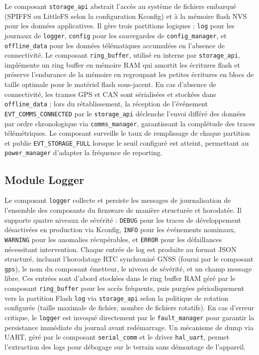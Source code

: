 Le composant \texttt{storage\_api} abstrait l'accès au système de
fichiers embarqué (SPIFFS ou LittleFS selon la configuration Kconfig)
et à la mémoire flash NVS pour les données applicatives. Il gère
trois partitions logiques : \texttt{log} pour les journaux de
\texttt{logger}, \texttt{config} pour les sauvegardes de
\texttt{config\_manager}, et \texttt{offline\_data} pour les
données télématiques accumulées en l'absence de connectivité.
Le composant \texttt{ring\_buffer}, utilisé en interne par
\texttt{storage\_api}, implémente un ring buffer en mémoire RAM qui
amortit les écritures flash et préserve l'endurance de la mémoire
en regroupant les petites écritures en blocs de taille optimale pour
le matériel flash sous-jacent. En cas d'absence de connectivité,
les trames GPS et CAN sont sérialisées et stockées dans
\texttt{offline\_data} ; lors du rétablissement, la réception de
l'événement \texttt{EVT\_COMMS\_CONNECTED} par le \texttt{storage\_api}
déclenche l'envoi différé des données par ordre chronologique via
\texttt{comms\_manager}, garantissant la complétude des traces
télémétriques. Le composant surveille le taux de remplissage de
chaque partition et publie \texttt{EVT\_STORAGE\_FULL} lorsque
le seuil configuré est atteint, permettant au \texttt{power\_manager}
d'adapter la fréquence de reporting.

\subsection{Module Logger}
\label{subsec:mod_logger}

Le composant \texttt{logger} collecte et persiste les messages de
journalisation de l'ensemble des composants du firmware de manière
structurée et horodatée. Il supporte quatre niveaux de sévérité :
\texttt{DEBUG} pour les traces de développement désactivées en
production via Kconfig, \texttt{INFO} pour les événements nominaux,
\texttt{WARNING} pour les anomalies récupérables, et \texttt{ERROR}
pour les défaillances nécessitant intervention. Chaque entrée de log
est produite au format JSON structuré, incluant l'horodatage RTC
synchronisé GNSS (fourni par le composant \texttt{gps}), le nom
du composant émetteur, le niveau de sévérité, et un champ message
libre. Ces entrées sont d'abord stockées dans le ring buffer RAM
géré par le composant \texttt{ring\_buffer} pour les accès fréquents,
puis purgées périodiquement vers la partition Flash \texttt{log} via
\texttt{storage\_api} selon la politique de rotation configurée
(taille maximale de fichier, nombre de fichiers rotatifs). En cas
d'erreur critique, le \texttt{logger} est invoqué directement par
le \texttt{fault\_manager} pour garantir la persistance immédiate
du journal avant redémarrage. Un mécanisme de dump via UART, géré
par le composant \texttt{serial\_comm} et le driver \texttt{hal\_uart},
permet l'extraction des logs pour débogage sur le terrain sans
démontage de l'appareil.

